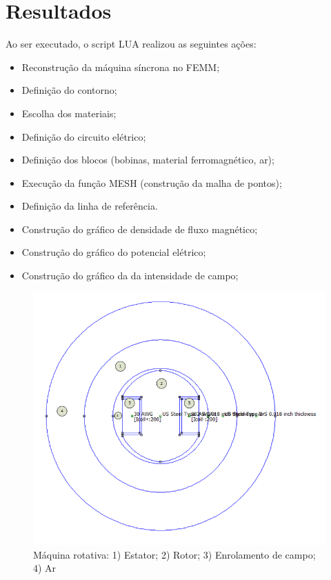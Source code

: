 \section{Resultados}
Ao ser executado, o script LUA realizou as seguintes ações:
\begin{itemize}
\item Reconstrução da máquina síncrona no FEMM;
\item Definição do contorno;
\item Escolha dos materiais;
\item Definição do circuito elétrico;
\item Definição dos blocos (bobinas, material ferromagnético, ar);
\item Execução da função MESH (construção da malha de pontos);
\item Definição da linha de referência.
\item Construção do gráfico de densidade de fluxo magnético;
\item Construção do gráfico do potencial elétrico;
\item Construção do gráfico da da intensidade de campo;
\end{itemize}
%

\begin{figure}[H]
\centering
\includegraphics[scale=0.6]{img/assig4/femm_des.png}
\caption[Máquina rotativa]{Máquina rotativa: 1) Estator; 2) Rotor; 3) Enrolamento de campo; 4) Ar }
\label{}
\end{figure}

